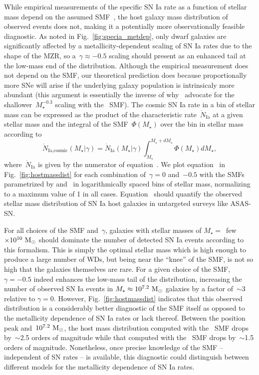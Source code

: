 \documentclass[ms.tex]{subfiles}
\begin{document}
While empirical measurements of the specific SN Ia rate as a function of
stellar mass depend on the assumed SMF~\citep{Gandhi2022}, the host galaxy
mass distribution of observed events does not, making it a potentially more
observationally feasible diagnostic.
As noted in Fig.~\ref{fig:specia_metdep}, only dwarf galaxies are
significantly affected by a metallicity-dependent scaling of SN Ia rates due to
the shape of the MZR, so a~$\gamma \approx -0.5$ scaling should present as an
enhanced tail at the low-mass end of the distribution.
Although the empirical measurement does not depend on the SMF, our theoretical
prediction does because proportionally more SNe will arise if the underlying
galaxy population is intrinsicaly more abundant (this argument is essentially
the inverse of why~\citealt{Gandhi2022} advocate for the
shallower~$M_\star^{-0.3}$ scaling with the~\citealt{Baldry2012} SMF).
The cosmic SN Ia rate in a bin of stellar mass can be expressed as the product
of the characteristic rate~$\dot{N}_\text{Ia}$ at a given stellar mass and
the integral of the SMF~$\Phi(M_\star)$ over the bin in stellar mass according
to
\begin{equation}
\dot{N}_\text{Ia,cosmic}(M_\star | \gamma) = \dot{N}_\text{Ia}(M_\star | \gamma)
\int_{M_\star}^{M_\star + dM_\star} \Phi(M_\star) dM_\star,
\label{eq:hostmassdist}
\end{equation}
where~$\dot{N}_\text{Ia}$ is given by the numerator of
equation~.
We plot equation~ in Fig.~\ref{fig:hostmassdist} for
each combination of~$\gamma = 0$ and~$-0.5$ with the SMFs parametrized by
\citet{Bell2003} and~\citet{Baldry2012} in logarithmically spaced bins of
stellar mass, normalizing to a maximum value of 1 in all cases.
Equation~ should quantify the observed stellar mass
distribution of SN Ia host galaxies in untargeted surveys like ASAS-SN.
\par
For all choices of the SMF and~$\gamma$, galaxies with stellar masses of
$M_\star =$~few$\times10^{10}~\text{M}_\odot$ should dominate the number of detected SN
Ia events according to this formalism.
This is simply the optimal stellar mass which is high enough to produce a large
number of WDs, but being near the ``knee'' of the SMF, is not so high that the
galaxies themselves are rare.
For a given choice of the SMF, $\gamma = -0.5$ indeed enhances the low-mass
tail of the distribution, increasing the number of observed SN Ia events in
$M_\star \approx 10^{7.2}~\text{M}_\odot$ galaxies by a factor of~$\sim$3 relative to
$\gamma = 0$.
However, Fig.~\ref{fig:hostmassdist} indicates that this observed distribution
is a considerably better diagnostic of the SMF itself as opposed to the
metallicity dependence of SN Ia rates or lack thereof.
Between the position peak and~$10^{7.2}~\text{M}_\odot$, the host mass distribution
computed with the~\citet{Bell2003} SMF drops by~$\sim$2.5 orders of magnitude
while that computed with the~\citet{Baldry2012} SMF drops by~$\sim$1.5 orders
of magnitude.
Nonetheless, once precise knowledge of the SMF -- independent of SN rates -- is
available, this diagnostic could distinguish between different models for the
metallicity dependence of SN Ia rates.
\end{document}
